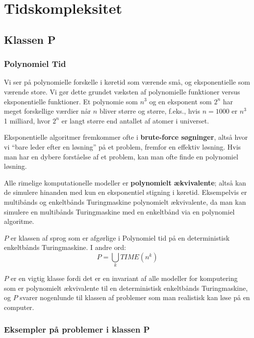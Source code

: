 \chapter{Tidskompleksitet}

\section{Klassen P}%
\label{sec:p}

\subsection{Polynomiel Tid}%
\label{subsec:polynomialtime}

Vi ser på polynomielle forskelle i køretid som værende små, og eksponentielle som værende store. Vi gør dette grundet væksten af polynomielle funktioner versus eksponentielle funktioner. Et polynomie som $n^{3}$ og en eksponent som $2^{n}$ har meget forskellige værdier når $n$ bliver større og større, f.eks., hvis $n = 1000$ er $n^{3}$ 1 milliard, hvor $2^{n}$ er langt større end antallet af atomer i universet.

Eksponentielle algoritmer fremkommer ofte i \textbf{brute-force søgninger}, altså hvor vi ``bare leder efter en løsning'' på et problem, fremfor en effektiv løsning. Hvis man har en dybere forståelse af et problem, kan man ofte finde en polynomiel løsning.

Alle rimelige komputationelle modeller er \textbf{polynomielt ækvivalente}; altså kan de simulere hinanden med kun en eksponentiel stigning i køretid. Eksempelvis er multibånds og enkeltbånds Turingmaskine polynomielt ækvivalente, da man kan simulere en multibånds Turingmaskine med en enkeltbånd via en polynomiel algoritme.

\begin{definition}
	$P$ er klassen af sprog som er afgørlige i Polynomiel tid på en deterministisk enkeltbånds Turingmaskine. I andre ord:
	\begin{equation*}
		P = \bigcup_{k} TIME(n^{k})
	\end{equation*}
\end{definition}

$P$ er en vigtig klasse fordi det er en invariant af alle modeller for komputering som er polynomielt ækvivalente til en deterministisk enkeltbånds Turingmaskine, og $P$ svarer nogenlunde til klassen af problemer som man realistisk kan løse på en computer.

\subsection{Eksempler på problemer i klassen P}%
\label{subsec:examplesinp}

